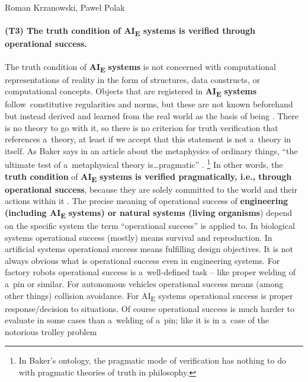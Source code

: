 \begin{artengenv2auth}{Roman Krzanowski, Pawel Polak}
\paragraph{(T3) The truth condition of AI\textsubscript{E} systems is verified through operational success.}
The truth condition of \textbf{AI}\textbf{\textsubscript{E}} \textbf{systems} is not concerned with computational representations of reality in the form of structures, data constructs, or computational concepts. Objects that are registered in \textbf{AI}\textbf{\textsubscript{E}} \textbf{systems} follow~constitutive regularities and norms, but these are not known beforehand but instead derived and learned from the real world as the basis of being
\parencite[][p.103]{smith_promise_2019}. %
 There is no theory to go with it, so there is no criterion for truth verification that references a~theory, at least if we accept that this statement is not a~theory in itself. As Baker says in an article about the metaphysics of ordinary things, ``the ultimate test of a~metaphysical theory is…pragmatic'' 
\parencite[][p.11]{baker_metaphysics_2007}.%
\footnote{In Baker's ontology, the pragmatic mode of verification has nothing to do with pragmatic theories of truth in philosophy.} In other words, the \textbf{truth condition} of \textbf{AI}\textbf{\textsubscript{E}} \textbf{systems is verified pragmatically, i.e., through operational success}, because they are solely committed to the world and their actions within it 
\parencite[][p.145]{smith_promise_2019}. %
 The precise meaning of operational success of \textbf{engineering (including AI}\textbf{\textsubscript{E}} \textbf{systems) or natural systems (living organisms}) depend on the specific system the term ``operational success'' is applied to. In biological systems operational success (mostly) means survival and reproduction. In artificial systems operational success means fulfilling design objectives. It is not always obvious what is operational success even in engineering systems. For factory robots operational success is a~well-defined task -- like proper welding of a~pin or similar. For autonomous vehicles operational success means (among other things) collision avoidance. For AI\textsubscript{E} systems operational success is proper response/decision to situations. Of course operational success is much harder to evaluate in some cases than a~welding of a~pin; like it is in a~case of the notorious trolley problem 

\end{artengenv2auth}
